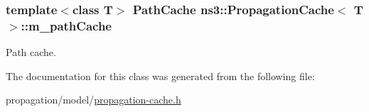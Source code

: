 \subsubsection[{\texorpdfstring{m\+\_\+path\+Cache}{m_pathCache}}]{\setlength{\rightskip}{0pt plus 5cm}template$<$class T$>$ {\bf Path\+Cache} {\bf ns3\+::\+Propagation\+Cache}$<$ T $>$\+::m\+\_\+path\+Cache\hspace{0.3cm}{\ttfamily [private]}}\hypertarget{classns3_1_1PropagationCache_a4ca67187982022709a0c12bfefb3d8a4}{}\label{classns3_1_1PropagationCache_a4ca67187982022709a0c12bfefb3d8a4}


Path cache. 



The documentation for this class was generated from the following file\+:\begin{DoxyCompactItemize}
\item 
propagation/model/\hyperlink{propagation-cache_8h}{propagation-\/cache.\+h}\end{DoxyCompactItemize}
